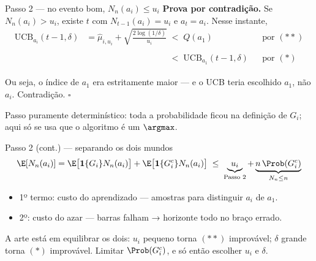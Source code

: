 \documentclass[aspectratio=169, 11pt]{beamer}
\newcommand{\muh}{\widehat{\mu}}
\newcommand{\Ind}{\mathbf{1}}
\newcommand{\ucb}{\mathrm{UCB}}
\begin{document}
\begin{frame}{Passo 2 --- no evento bom, $N_n(a_i)\le u_i$}
  \textbf{Prova por contradição.} Se $N_n(a_i)>u_i$, existe $t$ com
  $N_{t-1}(a_i)=u_i$ e $a_t=a_i$. Nesse instante,
  \begin{align*}
    \ucb_{a_i}(t-1,\delta)
      &= \muh_{i,u_i} + \sqrt{\tfrac{2\log(1/\delta)}{u_i}}
       \;<\; Q(a_1) &&\text{por } (**)\\[-0.1em]
      &\phantom{= \muh_{i,u_i} + \sqrt{\tfrac{2\log(1/\delta)}{u_i}}\;}
       <\; \ucb_{a_1}(t-1,\delta) &&\text{por } (*)
  \end{align*}
  \vspace{-0.6em}

  Ou seja, o índice de $a_1$ era estritamente maior --- e o UCB teria
  escolhido $a_1$, não $a_i$. Contradição. \hfill$\square$

  \begin{ideiabox}
    Passo \alert{puramente determinístico}: toda a probabilidade ficou na
    definição de $G_i$; aqui só se usa que o algoritmo é um $\argmax$.
  \end{ideiabox}
\end{frame}

\begin{frame}{Passo 2 (cont.) --- separando os dois mundos}
  \[
    \E[N_n(a_i)]
      = \E\bigl[\Ind\{G_i\}N_n(a_i)\bigr] + \E\bigl[\Ind\{G_i^{c}\}N_n(a_i)\bigr]
      \;\le\; \underbrace{u_i}_{\text{Passo 2}} + \underbrace{n\,\Prob(G_i^{c})}_{N_n\le n}
  \]

  \begin{itemize}\small
    \item 1º termo: \alert{custo do aprendizado} --- amostras para distinguir
          $a_i$ de $a_1$.
    \item 2º: \alert{custo do azar} --- barras falham → horizonte todo no
          braço errado.
  \end{itemize}

  \begin{alertabox}
    A arte está em equilibrar os dois: $u_i$ pequeno torna $(**)$
    improvável; $\delta$ grande torna $(*)$ improvável. Limitar
    $\Prob(G_i^{c})$, e só então escolher $u_i$ e $\delta$.
  \end{alertabox}
\end{frame}
\end{document}
